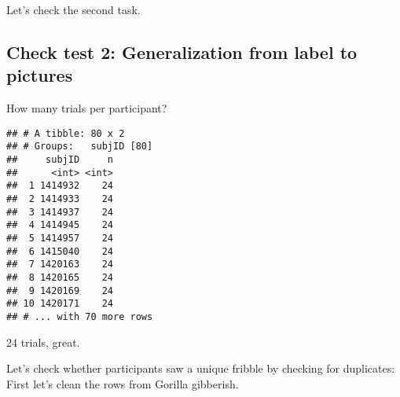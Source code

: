 \documentclass[
]{article}
\newenvironment{Shaded}{\begin{snugshade}}{\end{snugshade}}
\newcommand{\KeywordTok}[1]{\textcolor[rgb]{0.13,0.29,0.53}{\textbf{#1}}}
\newcommand{\NormalTok}[1]{#1}
\newcommand{\OperatorTok}[1]{\textcolor[rgb]{0.81,0.36,0.00}{\textbf{#1}}}
\newcommand{\StringTok}[1]{\textcolor[rgb]{0.31,0.60,0.02}{#1}}
\begin{document}
Let's check the second task.

\hypertarget{check-test-2-generalization-from-label-to-pictures}{%
\subsection{Check test 2: Generalization from label to
pictures}\label{check-test-2-generalization-from-label-to-pictures}}

\begin{Shaded}
\end{Shaded}

How many trials per participant?

\begin{Shaded}
\end{Shaded}

\begin{verbatim}
## # A tibble: 80 x 2
## # Groups:   subjID [80]
##     subjID     n
##      <int> <int>
##  1 1414932    24
##  2 1414933    24
##  3 1414937    24
##  4 1414945    24
##  5 1414957    24
##  6 1415040    24
##  7 1420163    24
##  8 1420165    24
##  9 1420169    24
## 10 1420171    24
## # ... with 70 more rows
\end{verbatim}

24 trials, great.

Let's check whether participants saw a unique fribble by checking for
duplicates: First let's clean the rows from Gorilla gibberish.
\end{document}

